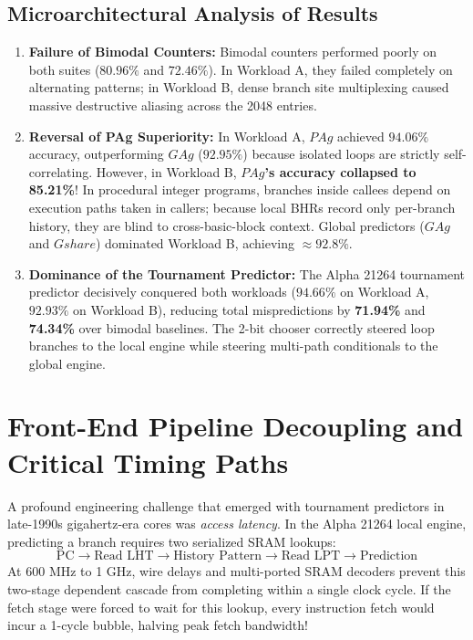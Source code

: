 \documentclass[11pt,a4paper]{article}
\begin{document}
\subsection{Microarchitectural Analysis of Results}
\begin{enumerate}[leftmargin=1.8em, itemsep=0.4em]
    \item \textbf{Failure of Bimodal Counters:} Bimodal counters performed poorly on both suites ($80.96\%$ and $72.46\%$). In Workload A, they failed completely on alternating patterns; in Workload B, dense branch site multiplexing caused massive destructive aliasing across the 2048 entries.
    \item \textbf{Reversal of PAg Superiority:} In Workload A, $PAg$ achieved $94.06\%$ accuracy, outperforming $GAg$ ($92.95\%$) because isolated loops are strictly self-correlating. However, in Workload B, \textbf{$PAg$'s accuracy collapsed to 85.21\%}! In procedural integer programs, branches inside callees depend on execution paths taken in callers; because local BHRs record only per-branch history, they are blind to cross-basic-block context. Global predictors ($GAg$ and $Gshare$) dominated Workload B, achieving $\approx 92.8\%$.
    \item \textbf{Dominance of the Tournament Predictor:} The Alpha 21264 tournament predictor decisively conquered both workloads ($94.66\%$ on Workload A, $92.93\%$ on Workload B), reducing total mispredictions by \textbf{71.94\%} and \textbf{74.34\%} over bimodal baselines. The 2-bit chooser correctly steered loop branches to the local engine while steering multi-path conditionals to the global engine.
\end{enumerate}

\section{Front-End Pipeline Decoupling and Critical Timing Paths}
\label{sec:timing}

A profound engineering challenge that emerged with tournament predictors in late-1990s gigahertz-era cores was \textit{access latency}. In the Alpha 21264 local engine, predicting a branch requires two serialized SRAM lookups:
\begin{equation}
    \text{PC} \longrightarrow \text{Read LHT} \longrightarrow \text{History Pattern} \longrightarrow \text{Read LPT} \longrightarrow \text{Prediction}
\end{equation}
At 600 MHz to 1 GHz, wire delays and multi-ported SRAM decoders prevent this two-stage dependent cascade from completing within a single clock cycle. If the fetch stage were forced to wait for this lookup, every instruction fetch would incur a 1-cycle bubble, halving peak fetch bandwidth!
\end{document}
